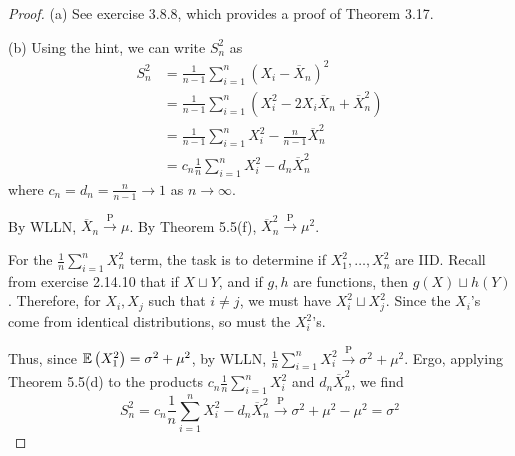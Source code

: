 \documentclass[a4paper]{article}
\begin{document}
\begin{proof}[Proof] 
\par (a) See exercise 3.8.8, which provides a proof of Theorem 3.17.
\vspace{12pt}
\par (b) Using the hint, we can write \(S^{2}_{n}\) as
\begin{align*}
	S^{2}_{n} & = \frac{1}{n-1} \sum_{i=1}^{n} \left( X_{i} - \overline{X}_{n} \right)^{2} \\
	 & = \frac{1}{n-1} \sum_{i=1}^{n} \left( X^{2}_{i} - 2X_{i} \overline{X}_{n} + \overline{X}^{2}_{n} \right)  \\ 
	 & = \frac{1}{n-1} \sum_{i=1}^{n} X^{2}_{i} - \frac{n}{n-1} \overline{X}^{2}_{n} \\
	 & = c_{n} \frac{1}{n} \sum_{i=1}^{n} X^{2}_{i} - d_{n} \overline{X}^{2}_{n}
\end{align*}
where \(c_{n} = d_{n} = \frac{n}{n-1} \rightarrow 1\) as \(n \rightarrow \infty\).

By WLLN, \(\overline{X}_{n} \xrightarrow{\text{ P }} \mu \). By Theorem 5.5(f), \(\overline{X}^{2}_{n} \xrightarrow{\text{ P }} \mu^{2}\). 

For the \(\frac{1}{n} \sum_{i=1}^{n} X^{2}_{n}\) term, the task is to determine if \(X^{2}_{1}, \dots, X^{2}_{n}\) are \textsf{IID}. Recall from exercise 2.14.10 that if \(X \sqcup Y\), and if \(g, h\) are functions, then \(g \left( X \right) \sqcup h \left( Y \right) \). Therefore, for \(X_{i}, X_{j}\) such that \(i \neq j\), we must have \(X^{2}_{i} \sqcup X^{2}_{j}\). Since the \(X_{i}\)'s come from identical distributions, so must the \(X^{2}_{i}\)'s.

Thus, since \(\mathbb{E}\left( X^{2}_{1} \right) = \sigma^{2} + \mu^{2}\), by WLLN, \(\frac{1}{n} \sum_{i=1}^{n} X^{2}_{i} \xrightarrow{\text{ P }} \sigma^{2} + \mu^{2}\). Ergo, applying Theorem 5.5(d) to the products \(c_{n} \frac{1}{n} \sum_{i=1}^{n} X^{2}_{i}\) and \(d_{n} \overline{X}^{2}_{n}\), we find
\[
	S^{2}_{n} = c_{n} \frac{1}{n} \sum_{i=1}^{n} X^{2}_{i} - d_{n} \overline{X}^{2}_{n} \xrightarrow{\text{ P }} \sigma^{2} + \mu^{2} - \mu^{2} = \sigma^{2}
\]
\end{proof}
\end{document}
